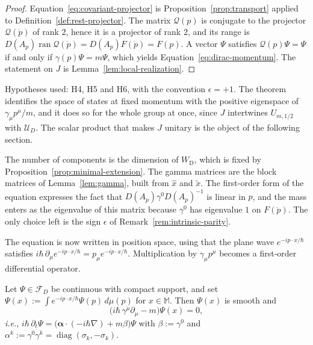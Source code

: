 \begin{proof}
	Equation~\eqref{eq:covariant-projector} is Proposition~\ref{prop:transport} applied to Definition~\ref{def:rest-projector}. The matrix $\mathcal{Q}(p)$ is conjugate to the projector $\mathcal{Q}(\mathring{p})$ of rank $2$, hence it is a projector of rank $2$, and its range is $D(A_p)\operatorname{ran}\mathcal{Q}(\mathring{p})=D(A_p)F(\mathring{p})=F(p)$. A vector $\Psi$ satisfies $\mathcal{Q}(p)\Psi=\Psi$ if and only if $\gamma(p)\Psi=m\Psi$, which yields Equation~\eqref{eq:dirac-momentum}. The statement on $J$ is Lemma~\ref{lem:local-realization}.
\end{proof}

\noindent Hypotheses used: H4, H5 and H6, with the convention $\epsilon=+1$. The theorem identifies the space of states at fixed momentum with the positive eigenspace of $\gamma_\mu p^\mu/m$, and it does so for the whole group at once, since $J$ intertwines $U_{m,1/2}$ with $\mathcal{U}_D$. The scalar product that makes $J$ unitary is the object of the following section.

\begin{remark}\label{rem:dirac-outputs}
	The number of components is the dimension of $W_{\mathrm{D}}$, which is fixed by Proposition~\ref{prop:minimal-extension}. The gamma matrices are the block matrices of Lemma~\ref{lem:gamma}, built from $\hat{x}$ and $\tilde{x}$. The first-order form of the equation expresses the fact that $D(A_p)\gamma^0D(A_p)^{-1}$ is linear in $p$, and the mass enters as the eigenvalue of this matrix because $\gamma^0$ has eigenvalue $1$ on $F(\mathring{p})$. The only choice left is the sign $\epsilon$ of Remark~\ref{rem:intrinsic-parity}.
\end{remark}

The equation is now written in position space, using that the plane wave $e^{-ip\cdot x/\hbar}$ satisfies $i\hbar\,\partial_\mu e^{-ip\cdot x/\hbar}=p_\mu e^{-ip\cdot x/\hbar}$. Multiplication by $\gamma_\mu p^\mu$ becomes a first-order differential operator.

\begin{corollary}\label{cor:dirac-position}
	Let $\Psi\in\mathcal{F}_D$ be continuous with compact support, and set $\Psi(x):=\int e^{-ip\cdot x/\hbar}\Psi(p)\,d\mu(p)$ for $x\in\mathbb{M}$. Then $\Psi(x)$ is smooth and
	\begin{equation}\label{eq:dirac-position}
		\big(i\hbar\,\gamma^\mu\partial_\mu-m\big)\Psi(x)=0,
	\end{equation}
	\textit{i.e.}, $i\hbar\,\partial_t\Psi=\big(\boldsymbol{\alpha}\cdot(-i\hbar\nabla)+m\beta\big)\Psi$ with $\beta:=\gamma^0$ and $\alpha^k:=\gamma^0\gamma^k=\operatorname{diag}(\sigma_k,-\sigma_k)$.
\end{corollary}

